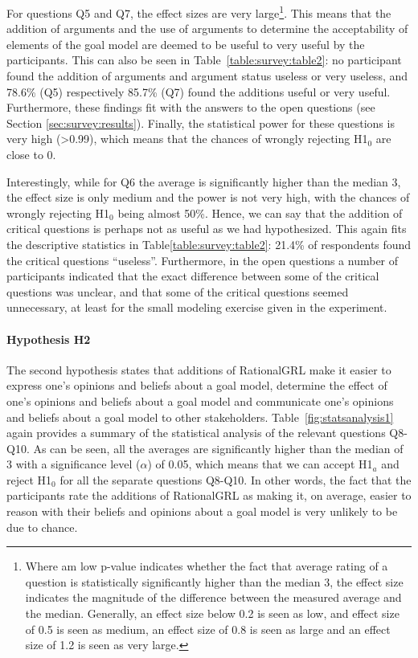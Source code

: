 For questions Q5 and Q7, the effect sizes are very large\footnote{Where am low p-value indicates whether the fact that average rating of a question is statistically significantly higher than the median 3, the effect size indicates the magnitude of the difference between the measured average and the median. Generally, an effect size below 0.2 is seen as low, and effect size of 0.5 is seen as medium, an effect size of 0.8 is seen as large and an effect size of 1.2 is seen as very large.}. This means that the addition of arguments and the use of arguments to determine the acceptability of elements of the goal model are deemed to be useful to very useful by the participants. This can also be seen in Table~\ref{table:survey:table2}: no participant found the addition of arguments and argument status useless or very useless, and 78.6\% (Q5) respectively 85.7\% (Q7) found the additions useful or very useful. Furthermore, these findings fit with the answers to the open questions (see Section \ref{sec:survey:results}). Finally, the statistical power for these questions is very high (\textgreater 0.99), which means that the chances of wrongly rejecting H1$_{0}$ are close to 0. 

Interestingly, while for Q6 the average is significantly higher than the median 3, the effect size is only medium and the power is not very high, with the chances of wrongly rejecting H1$_{0}$ being almost 50\%. Hence, we can say that the addition of critical questions is perhaps not as useful as we had hypothesized. This again fits the descriptive statistics in Table\ref{table:survey:table2}: 21.4\% of respondents found the critical questions ``useless''. Furthermore, in the open questions a number of participants indicated that the exact difference between some of the critical questions was unclear, and that some of the critical questions seemed unnecessary, at least for the small modeling exercise given in the experiment.

\paragraph{Hypothesis H2}
The second hypothesis states that additions of RationalGRL make it easier to express one's opinions and beliefs about a goal model, determine the effect of one's opinions and beliefs about a goal model and communicate one's opinions and beliefs about a goal model to other stakeholders. Table~\ref{fig:statsanalysis1} again provides a summary of the statistical analysis of the relevant questions Q8-Q10. As can be seen, all the averages are significantly higher than the median of 3 with a significance level ($\alpha$) of 0.05, which means that we can accept H1$_{a}$ and reject H1$_{0}$ for all the separate questions Q8-Q10. In other words, the fact that the participants rate the additions of RationalGRL as making it, on average, easier to reason with their beliefs and opinions about a goal model is very unlikely to be due to chance. 

